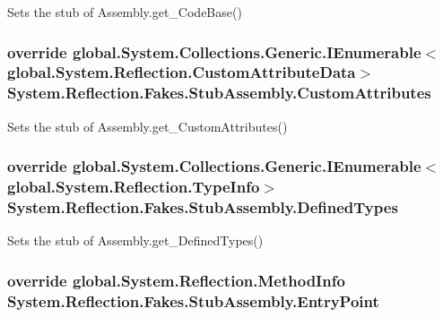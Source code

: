 Sets the stub of Assembly.\-get\-\_\-\-Code\-Base()

\hypertarget{class_system_1_1_reflection_1_1_fakes_1_1_stub_assembly_aac534c52db3ef006504858a77f0b1666}{
\subsubsection[{Custom\-Attributes}]{\setlength{\rightskip}{0pt plus 5cm}override global.\-System.\-Collections.\-Generic.\-I\-Enumerable$<$global.\-System.\-Reflection.\-Custom\-Attribute\-Data$>$ System.\-Reflection.\-Fakes.\-Stub\-Assembly.\-Custom\-Attributes\hspace{0.3cm}{\ttfamily [get]}}}\label{class_system_1_1_reflection_1_1_fakes_1_1_stub_assembly_aac534c52db3ef006504858a77f0b1666}


Sets the stub of Assembly.\-get\-\_\-\-Custom\-Attributes()

\hypertarget{class_system_1_1_reflection_1_1_fakes_1_1_stub_assembly_a6a9c0b39761e3e3a834d9b7610407967}{
\subsubsection[{Defined\-Types}]{\setlength{\rightskip}{0pt plus 5cm}override global.\-System.\-Collections.\-Generic.\-I\-Enumerable$<$global.\-System.\-Reflection.\-Type\-Info$>$ System.\-Reflection.\-Fakes.\-Stub\-Assembly.\-Defined\-Types\hspace{0.3cm}{\ttfamily [get]}}}\label{class_system_1_1_reflection_1_1_fakes_1_1_stub_assembly_a6a9c0b39761e3e3a834d9b7610407967}


Sets the stub of Assembly.\-get\-\_\-\-Defined\-Types()

\hypertarget{class_system_1_1_reflection_1_1_fakes_1_1_stub_assembly_afb9af18cefba8a7ff76b793afa87cbc6}{
\subsubsection[{Entry\-Point}]{\setlength{\rightskip}{0pt plus 5cm}override global.\-System.\-Reflection.\-Method\-Info System.\-Reflection.\-Fakes.\-Stub\-Assembly.\-Entry\-Point\hspace{0.3cm}{\ttfamily [get]}}}\label{class_system_1_1_reflection_1_1_fakes_1_1_stub_assembly_afb9af18cefba8a7ff76b793afa87cbc6}


